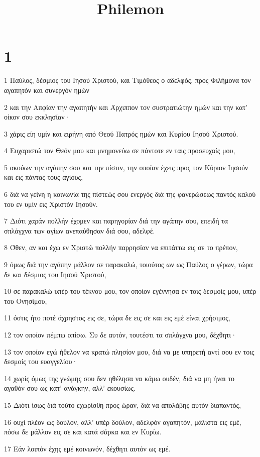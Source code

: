 

\title{Philemon}


\chapter{1}

\par 1 Παύλος, δέσμιος του Ιησού Χριστού, και Τιμόθεος ο αδελφός, προς Φιλήμονα τον αγαπητόν και συνεργόν ημών
\par 2 και την Απφίαν την αγαπητήν και Άρχιππον τον συστρατιώτην ημών και την κατ' οίκον σου εκκλησίαν·
\par 3 χάρις είη υμίν και ειρήνη από Θεού Πατρός ημών και Κυρίου Ιησού Χριστού.
\par 4 Ευχαριστώ τον Θεόν μου και μνημονεύω σε πάντοτε εν ταις προσευχαίς μου,
\par 5 ακούων την αγάπην σου και την πίστιν, την οποίαν έχεις προς τον Κύριον Ιησούν και εις πάντας τους αγίους,
\par 6 διά να γείνη η κοινωνία της πίστεώς σου ενεργός διά της φανερώσεως παντός καλού του εν υμίν εις Χριστόν Ιησούν.
\par 7 Διότι χαράν πολλήν έχομεν και παρηγορίαν διά την αγάπην σου, επειδή τα σπλάγχνα των αγίων ανεπαύθησαν διά σου, αδελφέ.
\par 8 Όθεν, αν και έχω εν Χριστώ πολλήν παρρησίαν να επιτάττω εις σε το πρέπον,
\par 9 όμως διά την αγάπην μάλλον σε παρακαλώ, τοιούτος ων ως Παύλος ο γέρων, τώρα δε και δέσμιος του Ιησού Χριστού,
\par 10 σε παρακαλώ υπέρ του τέκνου μου, τον οποίον εγέννησα εν τοις δεσμοίς μου, υπέρ του Ονησίμου,
\par 11 όστις ήτο ποτέ άχρηστος εις σε, τώρα δε εις σε και εις εμέ είναι χρήσιμος,
\par 12 τον οποίον πέμπω οπίσω. Συ δε αυτόν, τουτέστι τα σπλάγχνα μου, δέχθητι·
\par 13 τον οποίον εγώ ήθελον να κρατώ πλησίον μου, διά να με υπηρετή αντί σου εν τοις δεσμοίς του ευαγγελίου·
\par 14 χωρίς όμως της γνώμης σου δεν ηθέλησα να κάμω ουδέν, διά να μη ήναι το αγαθόν σου ως κατ' ανάγκην, αλλ' εκουσίως.
\par 15 Διότι ίσως διά τούτο εχωρίσθη προς ώραν, διά να απολάβης αυτόν διαπαντός,
\par 16 ουχί πλέον ως δούλον, αλλ' υπέρ δούλον, αδελφόν αγαπητόν, μάλιστα εις εμέ, πόσω δε μάλλον εις σε και κατά σάρκα και εν Κυρίω.
\par 17 Εάν λοιπόν έχης εμέ κοινωνόν, δέχθητι αυτόν ως εμέ.
